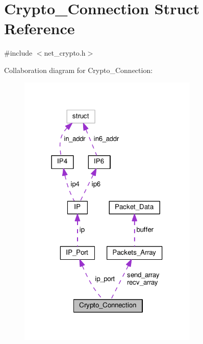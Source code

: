 \hypertarget{struct_crypto___connection}{\section{Crypto\+\_\+\+Connection Struct Reference}
\label{struct_crypto___connection}
}


{\ttfamily \#include $<$net\+\_\+crypto.\+h$>$}



Collaboration diagram for Crypto\+\_\+\+Connection\+:
\nopagebreak
\begin{figure}[H]
\begin{center}
\leavevmode
\includegraphics[width=243pt]{d4/d60/struct_crypto___connection__coll__graph}
\end{center}
\end{figure}
